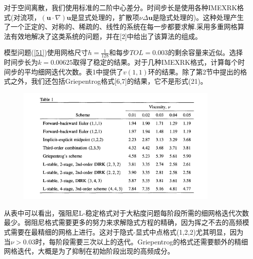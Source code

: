\documentclass[12pt,a4paper]{article}
\numberwithin{equation}{section}
\begin{document}
对于空间离散，我们使用标准的二阶中心差分。时间步长是使用各种IMEXRK格式(对流项，$(\mathbf{u}\cdot\nabla)\mathbf{u}$是显式处理的，扩散项$\nu \Delta\mathbf{u}$是隐式处理的)。这种处理产生了一个正定的、对称的、稀疏的、线性的系统在每一步都要求解.采用多重网格算法有效地解决了这类系统的问题，并在[2]中给出了该算法的组成。

模型问题(\ref{51})使用网格尺寸$h=\frac{1}{128}$和每步$TOL=0.003$的剩余容量来近似。选择时间步长为$k=0.00625$取得了稳定的结果。对于几种IMEXRK格式，计算每个时间步的平均细网迭代次数。表1中提供了$v(1,1)$环的结果。除了第2节中提出的格式之外，我们还包括Griepentrog格式[6,7]的结果，它不是形式(21)。

\begin{figure}[H]
\includegraphics[width=10cm]{./figures/6.png}
\centering
\label{Table1}
\end{figure}

从表中可以看出，强阻尼L-稳定格式对于大粘度问题每阶段所需的细网格迭代次数最少。弱阻尼格式需要更多的努力来求解隐式方程的精确，因为挥之不去的高频模式需要在最精细的网格上进行。这对于隐式-显式中点格式(1,2,2)尤其明显，因为当$\nu >0.03$时，每阶段需要三次以上的迭代。Griepentrog的格式还需要额外的精细网格迭代，大概是为了抑制在初始阶段出现的高频成分。
\end{document}

